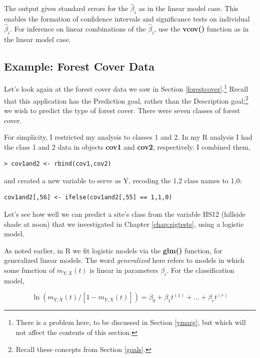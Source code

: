 The output gives standard errors for the $\widehat{\beta}_i$ as in the
linear model case.  This enables the formation of confidence intervals
and significance tests on individual $\widehat{\beta}_i$.  For inference
on linear combinations of the $\widehat{\beta}_i$, use the {\bf vcov()}
function as in the linear model case.

\subsection{Example:  Forest Cover Data}
\label{forest}

Let's look again at the forest cover data we saw in Section
\ref{forestcover}.\footnote{There is a problem here, to be discussed in
Section \ref{ymarg}, but which will not affect the contents of this
section.} Recall that this application has the Prediction goal, rather
than the Description goal;\footnote{Recall these concepts from Section
\ref{goals}.} we wish to predict the type of forest cover.  There were
seven classes of forest cover.  

For simplicity, I restricted my analysis to classes 1 and 2.  In my R
analysis I had the class 1 and 2 data in objects {\bf cov1} and {\bf
cov2}, respectively.  I combined them,

\begin{Verbatim}[fontsize=\relsize{-2}]
> cov1and2 <- rbind(cov1,cov2)
\end{Verbatim}

and created a new variable to serve as Y, recoding the 1,2 class names
to 1,0:

\begin{Verbatim}[fontsize=\relsize{-2}]
cov1and2[,56] <- ifelse(cov1and2[,55] == 1,1,0)
\end{Verbatim}

Let's see how well we can predict a site's class from the variable HS12
(hillside shade at noon) that we investigated in Chapter
\ref{chap:sigtests}, using a logistic model.

As noted earlier, in R we fit logistic models via the {\bf glm()}
function, for generalized linear models.  The word {\it generalized}
here refers to models in which some function of $m_{Y;X}(t)$ is linear
in parameters $\beta_i$.  For the classification model, 

\begin{equation}
\ln \left (  m_{Y;X}(t) / [1-m_{Y;X}(t)] \right )
= \beta_0 + \beta_1 t^{(1)} + ... + \beta_r t^{(r)}
\end{equation}

